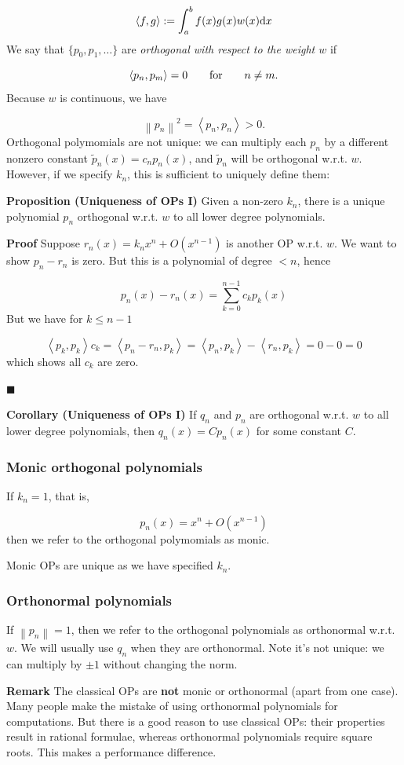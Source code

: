 \documentclass[12pt,a4paper]{article}
\def\qqfor{\qquad\hbox{for}\qquad}
\def\D{ {\rm d} }
\def\ip<#1>{\left\langle{#1}\right\rangle}
\def\dx{\D x}
\def\norm#1{\left\| #1 \right\|}
\begin{document}
\[
\ip<f,g> := \int_a^b f(x) g(x) w(x) \dx
\]
We say that $\{p_0, p_1,\ldots\}$ are \emph{orthogonal with respect to the weight $w$} if 

\[
\ip<p_n,p_m> = 0\qqfor n \neq m.
\]
Because $w$ is continuous, we have

\[
\norm{p_n}^2 = \ip<p_n,p_n> > 0 .
\]
Orthogonal polymomials are not unique: we can multiply each $p_n$ by a different nonzero constant $\tilde p_n(x) = c_n p_n(x)$, and  $\tilde p_n$ will be orthogonal w.r.t. $w$.  However, if we specify $k_n$, this is sufficient to uniquely define them:

\textbf{Proposition (Uniqueness of OPs I)} Given a non-zero $k_n$, there is a unique polynomial $p_n$ orthogonal w.r.t. $w$  to all lower degree polynomials.

\textbf{Proof} Suppose $r_n(x) = k_n x^n + O(x^{n-1})$ is another  OP w.r.t. $w$. We want to show $p_n - r_n$ is zero.  But this is a polynomial of degree $<n$, hence

\[
p_n(x) - r_n(x) = \sum_{k=0}^{n-1} c_k p_k(x)
\]
But we have for $k \leq n-1$

\[
\ip<p_k,p_k> c_k = \ip<p_n - r_n, p_k> = \ip<p_n,p_k> - \ip<r_n, p_k> = 0 - 0 = 0
\]
which shows all $c_k$ are zero.

\ensuremath{\blacksquare}

\textbf{Corollary (Uniqueness of OPs I)} If $q_n$ and $p_n$ are orthogonal w.r.t. $w$ to all lower degree polynomials,  then $q_n(x) = C p_n(x)$ for some constant $C$. 

\subsubsection{Monic orthogonal polynomials}
If $k_n = 1$, that is, 

\[
p_n(x) = x^n + O(x^{n-1})
\]
then we refer to the orthogonal polymomials as monic.

Monic OPs are unique as we have specified $k_n$.

\subsubsection{Orthonormal polynomials}
If  $\norm{p_n} = 1$, then we refer to the orthogonal polynomials as orthonormal w.r.t. $w$.   We will usually use $q_n$ when they are orthonormal.   Note it's not unique: we can multiply by $\pm 1$ without changing the norm.

\textbf{Remark} The classical OPs are \textbf{not} monic or orthonormal (apart from one case). Many people make the mistake of using  orthonormal polynomials for computations. But there is a good reason to use classical OPs: their properties result in rational formulae,  whereas orthonormal polynomials require square roots. This makes a performance difference.
\end{document}
